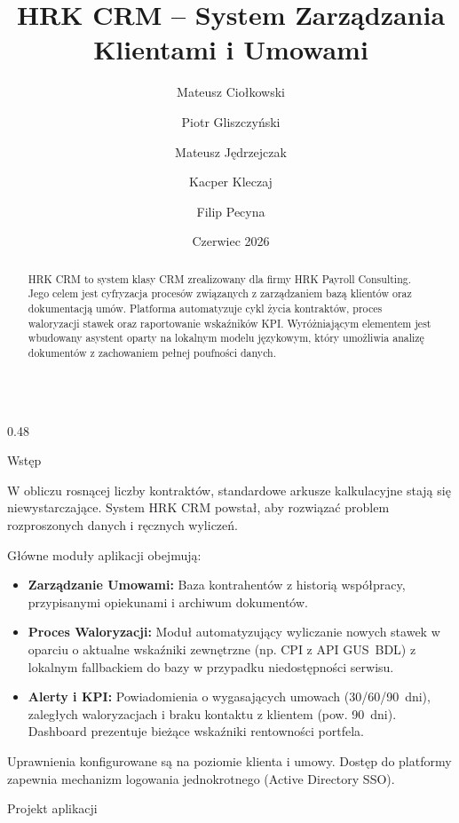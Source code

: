 \documentclass[final]{beamer} %
\title[\hspace{1cm} HRK CRM]{HRK CRM -- System Zarządzania Klientami i Umowami}
\author[\hspace{1cm} M.~Ciołkowski, P.~Gliszczyński, M.~Jędrzejczak, K.~Kleczaj, F.~Pecyna]{%
  Mateusz Ciołkowski \and Piotr Gliszczyński \and Mateusz Jędrzejczak \and Kacper Kleczaj \and Filip Pecyna}
\institute[Instytut Informatyki, Politechnika Łódzka, al. Politechniki 8, 93-590 Łódź \hspace{1cm}]{Instytut Informatyki, Politechnika Łódzka}
\date{Czerwiec 2026}
\begin{document}
\renewcommand{\abstractname}{Streszczenie}
\renewcommand{\figurename}{Rysunek}
\renewcommand{\tablename}{Tabela}

\begin{frame}{}
\maketitle
\begin{abstract}
\centering
HRK CRM to system klasy CRM zrealizowany dla firmy HRK Payroll Consulting. Jego celem jest cyfryzacja procesów związanych z zarządzaniem bazą klientów oraz dokumentacją umów. Platforma automatyzuje cykl życia kontraktów, proces waloryzacji stawek oraz raportowanie wskaźników KPI. Wyróżniającym elementem jest wbudowany asystent oparty na lokalnym modelu językowym, który umożliwia analizę dokumentów z zachowaniem pełnej poufności danych.
\end{abstract}
\begin{columns}[T]
\begin{column}[T]{0.48\textwidth}

\begin{block}{Wstęp}

W obliczu rosnącej liczby kontraktów, standardowe arkusze kalkulacyjne stają się niewystarczające. System HRK CRM powstał, aby rozwiązać problem rozproszonych danych i ręcznych wyliczeń.

Główne moduły aplikacji obejmują:
\begin{itemize}
    \item \textbf{Zarządzanie Umowami:} Baza kontrahentów z historią współpracy, przypisanymi opiekunami i archiwum dokumentów.
    \item \textbf{Proces Waloryzacji:} Moduł automatyzujący wyliczanie nowych stawek w oparciu o aktualne wskaźniki zewnętrzne (np. CPI z API GUS~BDL) z lokalnym fallbackiem do bazy w przypadku niedostępności serwisu.
    \item \textbf{Alerty i KPI:} Powiadomienia o wygasających umowach (30/60/90~dni), zaległych waloryzacjach i braku kontaktu z klientem (pow. 90~dni). Dashboard prezentuje bieżące wskaźniki rentowności portfela.
\end{itemize}
Uprawnienia konfigurowane są na poziomie klienta i umowy. Dostęp do platformy zapewnia mechanizm logowania jednokrotnego (Active Directory SSO).
\end{block}

\begin{block}{Projekt aplikacji}


\end{block}
\end{column}
\end{columns}
\end{frame}
\end{document}
